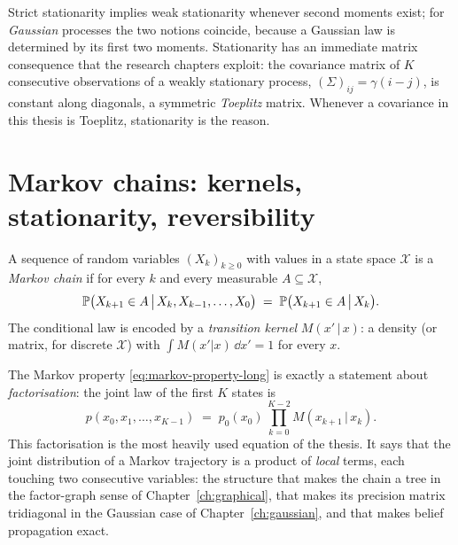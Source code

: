 Strict stationarity implies weak stationarity whenever second moments
exist; for \emph{Gaussian} processes the two notions coincide, because a
Gaussian law is determined by its first two moments. Stationarity has an
immediate matrix consequence that the research chapters exploit: the
covariance matrix of $K$ consecutive observations of a weakly stationary
process, $(\Sigma)_{ij} = \gamma(i - j)$, is constant along diagonals, a
symmetric \emph{Toeplitz} matrix. Whenever a covariance in this thesis is
Toeplitz, stationarity is the reason.

\section{Markov chains: kernels, stationarity, reversibility}
\label{sec:markov}

\begin{definition}
A sequence of random variables $(X_k)_{k \geq 0}$ with values in a state
space $\mathcal{X}$ is a \emph{Markov chain} if for every $k$ and every
measurable $A \subseteq \mathcal{X}$,
\begin{equation}
  \mathbb{P}\big(X_{k+1} \in A \,\big|\, X_k, X_{k-1}, \dots, X_0\big)
  \;=\; \mathbb{P}\big(X_{k+1} \in A \,\big|\, X_k\big) .
  \label{eq:markov-property-long}
\end{equation}
The conditional law is encoded by a \emph{transition kernel}
$M(x' \,|\, x)$: a density (or matrix, for discrete $\mathcal{X}$) with
$\int M(x'|x)\,\dd x' = 1$ for every $x$.
\end{definition}

The Markov property \eqref{eq:markov-property-long} is exactly a statement
about \emph{factorisation}: the joint law of the first $K$ states is
\begin{equation}
  p(x_0, x_1, \dots, x_{K-1})
  \;=\; p_0(x_0)\, \prod_{k=0}^{K-2} M(x_{k+1} \,|\, x_k) .
  \label{eq:chain-factorisation-long}
\end{equation}
This factorisation is the most heavily used equation of the thesis. It says that the joint distribution of a Markov trajectory is a
product of \emph{local} terms, each touching two consecutive variables:
the structure that makes the chain a tree in the factor-graph sense of
Chapter~\ref{ch:graphical}, that makes its precision matrix tridiagonal in
the Gaussian case of Chapter~\ref{ch:gaussian}, and that makes belief
propagation exact.


